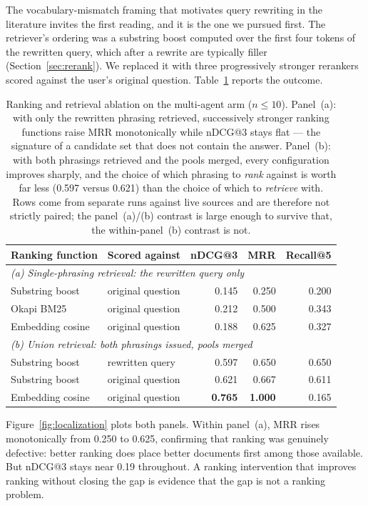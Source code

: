 \documentclass[acmsmall,review,anonymous,screen]{acmart}
\begin{document}
The vocabulary-mismatch framing that motivates query rewriting in the literature
invites the first reading, and it is the one we pursued first. The retriever's
ordering was a substring boost computed over the first four tokens of the
rewritten query, which after a rewrite are typically filler
(Section~\ref{sec:rerank}). We replaced it with three progressively stronger
rerankers scored against the user's original question.
Table~\ref{tab:ranking-ablation} reports the outcome.

\begin{table}[t]
\caption{Ranking and retrieval ablation on the multi-agent arm ($n \le 10$).
Panel~(a): with only the rewritten phrasing retrieved, successively stronger
ranking functions raise MRR monotonically while nDCG@3 stays flat --- the
signature of a candidate set that does not contain the answer. Panel~(b): with
both phrasings retrieved and the pools merged, every configuration improves
sharply, and the choice of which phrasing to \emph{rank} against is worth far
less (0.597 versus 0.621) than the choice of which to \emph{retrieve} with.
Rows come from separate runs against live sources and are therefore not strictly
paired; the panel~(a)/(b) contrast is large enough to survive that, the
within-panel~(b) contrast is not.}
\label{tab:ranking-ablation}
\begin{tabular}{llrrr}
\toprule
Ranking function & Scored against & nDCG@3 & MRR & Recall@5 \\
\midrule
\multicolumn{5}{l}{\emph{(a) Single-phrasing retrieval: the rewritten query only}} \\
Substring boost & original question & 0.145 & 0.250 & 0.200 \\
Okapi BM25      & original question & 0.212 & 0.500 & 0.343 \\
Embedding cosine & original question & 0.188 & 0.625 & 0.327 \\
\midrule
\multicolumn{5}{l}{\emph{(b) Union retrieval: both phrasings issued, pools merged}} \\
Substring boost & rewritten query  & 0.597 & 0.650 & 0.650 \\
Substring boost & original question & 0.621 & 0.667 & 0.611 \\
Embedding cosine & original question & \textbf{0.765} & \textbf{1.000} & 0.165 \\
\bottomrule
\end{tabular}
\end{table}

Figure~\ref{fig:localization} plots both panels. Within panel~(a), MRR rises
monotonically from 0.250 to 0.625, confirming that
ranking was genuinely defective: better ranking does place better documents
first among those available. But nDCG@3 stays near 0.19 throughout. A ranking
intervention that improves ranking without closing the gap is evidence that the
gap is not a ranking problem.
\end{document}
